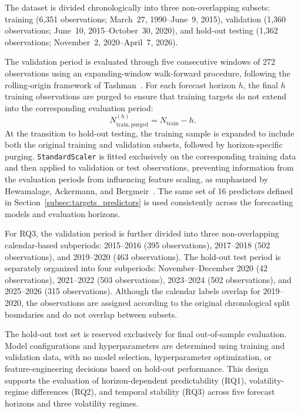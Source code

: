 \documentclass[12pt,twoside]{ord}
\begin{document}
The dataset is divided chronologically into three non-overlapping subsets: training (6,351 observations; March~27, 1990--June~9, 2015), validation (1,360 observations; June~10, 2015--October~30, 2020), and hold-out testing (1,362 observations; November~2, 2020--April~7, 2026).

The validation period is evaluated through five consecutive windows of 272 observations using an expanding-window walk-forward procedure, following the rolling-origin framework of Tashman~\cite{tashman2000}. For each forecast horizon $h$, the final $h$ training observations are purged to ensure that training targets do not extend into the corresponding evaluation period:
\begin{equation}\label{eq:train_purged}
N_{\mathrm{train,purged}}^{(h)} = N_{\mathrm{train}} - h.
\end{equation}
At the transition to hold-out testing, the training sample is expanded to include both the original training and validation subsets, followed by horizon-specific purging. \texttt{StandardScaler} is fitted exclusively on the corresponding training data and then applied to validation or test observations, preventing information from the evaluation periods from influencing feature scaling, as emphasized by Hewamalage, Ackermann, and Bergmeir~\cite{hewamalage2023}. The same set of 16 predictors defined in Section~\ref{subsec:targets_predictors} is used consistently across the forecasting models and evaluation horizons.

For RQ3, the validation period is further divided into three non-overlapping calendar-based subperiods: 2015--2016 (395 observations), 2017--2018 (502 observations), and 2019--2020 (463 observations). The hold-out test period is separately organized into four subperiods: November--December 2020 (42 observations), 2021--2022 (503 observations), 2023--2024 (502 observations), and 2025--2026 (315 observations). Although the calendar labels overlap for 2019--2020, the observations are assigned according to the original chronological split boundaries and do not overlap between subsets.

The hold-out test set is reserved exclusively for final out-of-sample evaluation. Model configurations and hyperparameters are determined using training and validation data, with no model selection, hyperparameter optimization, or feature-engineering decisions based on hold-out performance. This design supports the evaluation of horizon-dependent predictability (RQ1), volatility-regime differences (RQ2), and temporal stability (RQ3) across five forecast horizons and three volatility regimes.
\end{document}
